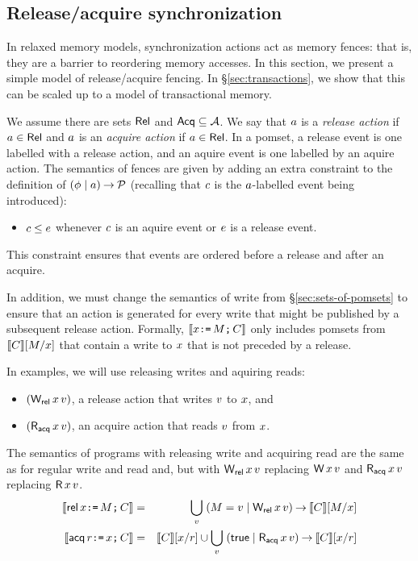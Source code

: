 \subsection{Release/acquire synchronization}
\label{sec:ra}

In relaxed memory models, synchronization actions act as memory fences: that
is, they are a barrier to reordering memory accesses.  In this section, we
present a simple model of release/acquire fencing. In
\S\ref{sec:transactions}, we show that this can be scaled up to a model of
transactional memory.

We assume there are sets $\mathsf{Rel}$ and $\mathsf{Acq} \subseteq\mathcal{A}$.  We say that
$a$ is a \emph{release action} if $a\in\mathsf{Rel}$ and $a$ is an
\emph{acquire action} if $a\in\mathsf{Rel}$.
In a pomset, a release event is one labelled with a release action,
and an aquire event is one labelled by an aquire action.
The semantics of fences are given by adding an extra constraint
to the definition of $(\phi\mid a)\mathbin\rightarrow\mathcal{P}$
(recalling that $c$ is the $a$-labelled event being introduced):
\begin{itemize}
\item $c \le e$ whenever $c$ is an aquire event or $e$ is a release event.
\end{itemize}
This constraint ensures that events are ordered before a
release and after an acquire.

In addition, we must change the semantics of write from
\S\ref{sec:sets-of-pomsets} to ensure that an action is generated for every
write that might be published by a subsequent release action.
Formally, $\llbracket x\texttt{:=}\,M\texttt{;}\, C\rrbracket$ only includes pomsets
from $\llbracket C\rrbracket[M/x]$ that contain a write to
$x$ that is not preceded by a release.

In examples, we will use
releasing writes and aquiring reads:
\begin{itemize}
\item $(\DWRel{\aLoc}{\aVal})$, a release action that writes $v$ to $x$, and
\item $(\DRAcq{\aLoc}{\aVal})$, an acquire action that reads $v$ from $x$.
\end{itemize}
The semantics of programs with releasing write and acquiring read are the
same as for regular write and read and, but with $\DWRel\aLoc\aVal$ replacing
$\DW\aLoc\aVal$ and $\DRAcq\aLoc\aVal$ replacing $\DR\aLoc\aVal$.  
\begin{eqnarray*}
  \sem{\REL\aLoc\GETS\aExp\SEMI \aCmd} & = & \bigcup_\aVal\; (\aExp=\aVal \mid \DWRel\aLoc\aVal) \prefix \sem{\aCmd}[\aExp/\aLoc] \\
  \sem{\ACQ\aReg\GETS\aLoc\SEMI \aCmd} & = & \sem{\aCmd}[\aLoc/\aReg] \cup \bigcup_\aVal\; (\TRUE \mid \DRAcq\aLoc\aVal) \prefix \sem{\aCmd}[\aLoc/\aReg] \\
\end{eqnarray*}


